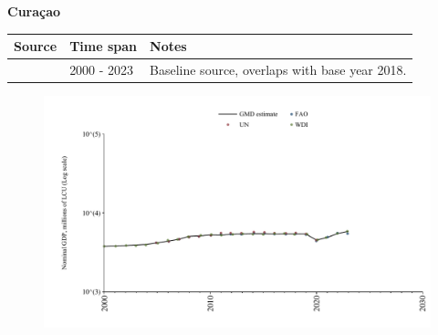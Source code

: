 \documentclass[12pt,a4paper,landscape]{article}
\begin{document}
\begin{adjustbox}{max totalsize={\paperwidth}{\paperheight},center}
\begin{minipage}[t][\textheight][t]{\textwidth}
\vspace*{0.5cm}
{}
\begin{center}
{\Large\bfseries Curaçao}
\end{center}
\vspace{0.5cm}
\begin{table}[H]
\centering
\small
\begin{tabular}{|l|l|l|}
\hline
\textbf{Source} & \textbf{Time span} & \textbf{Notes} \\
\hline
\rowcolor{white}\cite{WDI}& 2000 - 2023 &Baseline source, overlaps with base year 2018.\\
\hline
\end{tabular}
\end{table}
\begin{figure}[H]
\centering
\includegraphics[width=\textwidth,height=0.6\textheight,keepaspectratio]{graphs/CUW_nGDP.pdf}
\end{figure}
\end{minipage}
\end{adjustbox}
\end{document}
